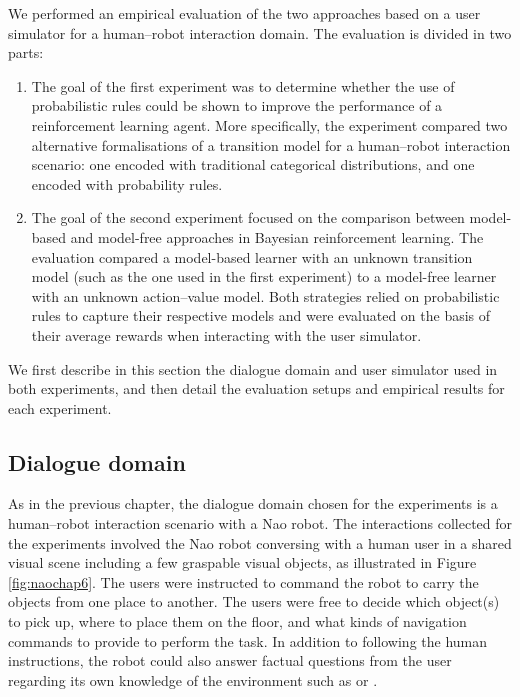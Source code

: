 We performed an empirical evaluation of the two approaches based on a user simulator for a human--robot interaction domain. The evaluation is divided in two parts: 
\begin{enumerate}
\item The goal of the first experiment was to determine whether the use of probabilistic rules could be shown to improve the performance of a reinforcement learning agent.  More specifically, the experiment compared two alternative formalisations of a transition model for a human--robot interaction scenario: one encoded with traditional categorical distributions, and one encoded with probability rules.  

\item The goal of the second experiment focused on the comparison between model-based and model-free approaches in Bayesian reinforcement learning. The evaluation compared a model-based learner with an unknown transition model (such as the one used in the first experiment) to a model-free learner with an unknown action--value model.  Both strategies relied on probabilistic rules to capture their respective models and were evaluated on the basis of their average rewards when interacting with the user simulator. 
\end{enumerate}

We first describe in this section the dialogue domain and user simulator used in both experiments, and then detail the evaluation setups and empirical results for each experiment. 

\subsection{Dialogue domain}
\label{sec:exp2_dd}
As in the previous chapter, the dialogue domain chosen for the experiments is a human--robot interaction scenario with a Nao robot.  The interactions collected for the experiments involved the Nao robot conversing with a human user in a shared visual scene including a few graspable visual objects, as illustrated in Figure \ref{fig:naochap6}.  The users were instructed to command the robot to carry the objects from one place to another. The users were free to decide which object(s) to pick up, where to place them on the floor, and what kinds of navigation commands to provide to perform the task.  In addition to following the human instructions, the robot could also answer factual questions from the user regarding its own knowledge of the environment such as  or . 

